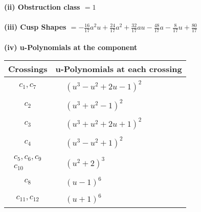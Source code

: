 \documentclass[1p]{elsarticle_modified}
\theoremstyle{definition}
\begin{document}
\flushleft \textbf{(ii) Obstruction class $= 1$}\\~\\
\flushleft \textbf{(iii) Cusp Shapes $= -\frac{16}{17} a^2 u+\frac{24}{17} a^2+\frac{32}{17} a u-\frac{48}{17} a-\frac{8}{17} u+\frac{80}{17}$}\\~\\
\newpage\renewcommand{\arraystretch}{1}
\flushleft \textbf{(iv) u-Polynomials at the component}\newline \\
\begin{tabular}{m{50pt}|m{274pt}}
Crossings & \hspace{64pt}u-Polynomials at each crossing \\
\hline $$\begin{aligned}c_{1},c_{7}\end{aligned}$$&$\begin{aligned}
&(u^3- u^2+2 u-1)^2
\end{aligned}$\\
\hline $$\begin{aligned}c_{2}\end{aligned}$$&$\begin{aligned}
&(u^3+u^2-1)^2
\end{aligned}$\\
\hline $$\begin{aligned}c_{3}\end{aligned}$$&$\begin{aligned}
&(u^3+u^2+2 u+1)^2
\end{aligned}$\\
\hline $$\begin{aligned}c_{4}\end{aligned}$$&$\begin{aligned}
&(u^3- u^2+1)^2
\end{aligned}$\\
\hline $$\begin{aligned}c_{5},c_{6},c_{9}\\c_{10}\end{aligned}$$&$\begin{aligned}
&(u^2+2)^3
\end{aligned}$\\
\hline $$\begin{aligned}c_{8}\end{aligned}$$&$\begin{aligned}
&(u-1)^6
\end{aligned}$\\
\hline $$\begin{aligned}c_{11},c_{12}\end{aligned}$$&$\begin{aligned}
&(u+1)^6
\end{aligned}$\\
\hline
\end{tabular}\\~\\
\end{document}
